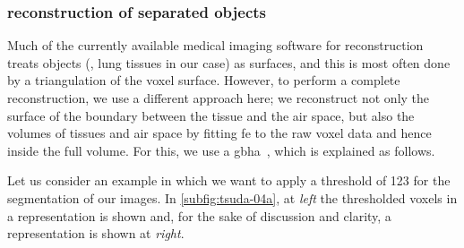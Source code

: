 \subsubsection{\threed reconstruction of separated objects}
Much of the currently available medical imaging software for \threed reconstruction treats objects (\ie, lung tissues in our case) as surfaces, and this is most often done by a triangulation of the voxel surface. However, to perform a complete \threed reconstruction, we use a different approach here; we reconstruct not only the surface of the boundary between the tissue and the air space, but also the volumes of tissues and air space by fitting \ac{fe} to the raw voxel data and hence inside the full volume. For this, we use a \ac{gbha}~\cite{Schneiders1996}, which is explained as follows.

Let us consider an example in which we want to apply a threshold of 123 for the segmentation of our images. In \autoref{subfig:tsuda-04a}, at \textit{left} the thresholded voxels in a \threed representation is shown and, for the sake of discussion and clarity, a \twod representation is shown at \textit{right}.
